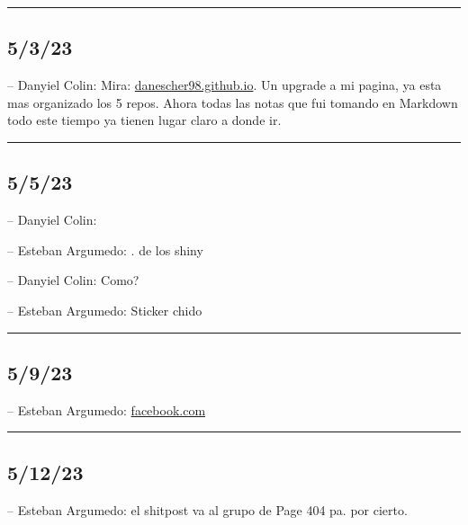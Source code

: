 \begin{center}\rule{0.5\linewidth}{0.5pt}\end{center}

\hypertarget{section-199}{%
\subsection{5/3/23}\label{section-199}}

-- Danyiel Colin: Mira:
\href{https://danescher98.github.io/}{danescher98.github.io}. Un upgrade
a mi pagina, ya esta mas organizado los 5 repos. Ahora todas las notas
que fui tomando en Markdown todo este tiempo ya tienen lugar claro a
donde ir.

\begin{center}\rule{0.5\linewidth}{0.5pt}\end{center}

\hypertarget{section-200}{%
\subsection{5/5/23}\label{section-200}}

-- Danyiel Colin:

-- Esteban Argumedo: . de los shiny

-- Danyiel Colin: Como?

-- Esteban Argumedo: Sticker chido

\begin{center}\rule{0.5\linewidth}{0.5pt}\end{center}

\hypertarget{section-201}{%
\subsection{5/9/23}\label{section-201}}

-- Esteban Argumedo:
\href{https://www.facebook.com/reel/970321420642339?mibextid=6AJuK9\&s=chYV2B\&fs=e}{facebook.com}

\begin{center}\rule{0.5\linewidth}{0.5pt}\end{center}

\hypertarget{section-202}{%
\subsection{5/12/23}\label{section-202}}

-- Esteban Argumedo: el shitpost va al grupo de Page 404 pa. por cierto.

